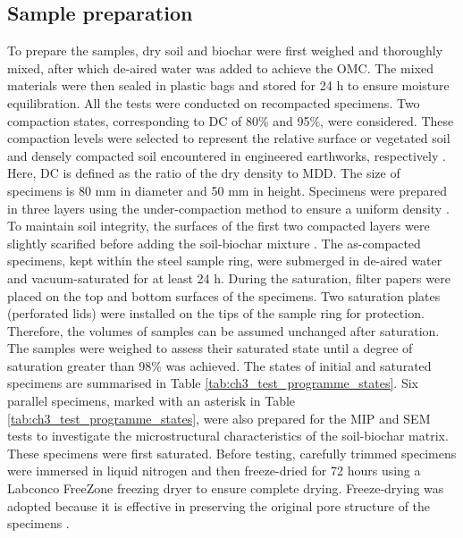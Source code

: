 \subsection{Sample preparation}
To prepare the samples, dry soil and biochar were first weighed and thoroughly mixed, after which de-aired water was added to achieve the OMC. The mixed materials were then sealed in plastic bags and stored for 24 h to ensure moisture equilibration. All the tests were conducted on recompacted specimens. Two compaction states, corresponding to \ac{DC} of 80\% and 95\%, were considered. These compaction levels were selected to represent the relative surface or vegetated soil and densely compacted soil encountered in engineered earthworks, respectively \parencite{gargInfluenceSoilDensity2021, ngEffectsPoreStructure2023, ngPoreStructureEffects2023}. Here, \ac{DC} is defined as the ratio of the dry density to \ac{MDD}. The size of specimens is 80 mm in diameter and 50 mm in height. Specimens were prepared in three layers using the under-compaction method to ensure a uniform density \parencite{laddPreparingTestSpecimens1978, ngEffectsSesquioxideContent2020}. To maintain soil integrity, the surfaces of the first two compacted layers were slightly scarified before adding the soil-biochar mixture \parencite{ngEffectsPoreStructure2023, ngPoreStructureEffects2023}. The as-compacted specimens, kept within the steel sample ring, were submerged in de-aired water and vacuum-saturated for at least 24 h. During the saturation, filter papers were placed on the top and bottom surfaces of the specimens. Two saturation plates (perforated lids) were installed on the tips of the sample ring for protection. Therefore, the volumes of samples can be assumed unchanged after saturation. The samples were weighed to assess their saturated state until a degree of saturation greater than 98\% was achieved. The states of initial and saturated specimens are summarised in Table \ref{tab:ch3_test_programme_states}. Six parallel specimens, marked with an asterisk in Table \ref{tab:ch3_test_programme_states}, were also prepared for the \ac{MIP} and \ac{SEM} tests to investigate the microstructural characteristics of the soil-biochar matrix. These specimens were first saturated. Before testing, carefully trimmed specimens were immersed in liquid nitrogen and then freeze-dried for 72 hours using a Labconco FreeZone freezing dryer to ensure complete drying. Freeze-drying was adopted because it is effective in preserving the original pore structure of the specimens \parencite{ngEffectsPoreStructure2023}.\par
